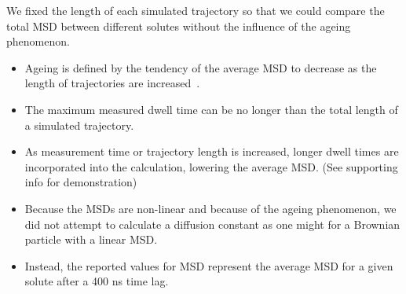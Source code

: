 \documentclass{article}
\begin{document}
  \noindent We fixed the length of each simulated trajectory so that we could compare
  the total MSD between different solutes without the influence of the ageing phenomenon.
  \begin{itemize}
	\item Ageing is defined by the tendency of the average MSD to decrease
	as the length of trajectories are increased~\cite{metzler_anomalous_2014}.
	\item The maximum measured dwell time can be no longer than the total length
	of a simulated trajectory. 
	\item As measurement time or trajectory length is increased, longer dwell times
	are incorporated into the calculation, lowering the average MSD. (See supporting
	info for demonstration)
	\item Because the MSDs are non-linear and because of the ageing phenomenon, we
    did not attempt to calculate a diffusion constant as one might for a Brownian
    particle with a linear MSD.
	\item Instead, the reported values for MSD represent the average MSD for a given
	solute after a 400 ns time lag.
  \end{itemize} 
  
  
\end{document}
